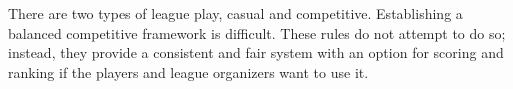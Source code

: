There are two types of league play, casual and competitive.
Establishing a balanced competitive framework is difficult.
These rules do not attempt to do so; instead, they provide a consistent and fair system with an option for scoring and ranking if the players and league organizers want to use it.
